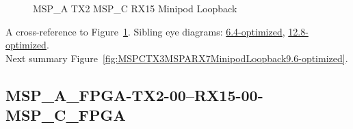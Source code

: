 \begin{figure}[h]
\begin{subfigure}{0.33\textwidth}
\hyperref[sec:MSPAFPGATX206RX1506MSPCFPGA9.6-optimized]{}
\end{subfigure}\hspace*{\fill}
\begin{subfigure}{0.33\textwidth}
\hyperref[sec:MSPAFPGATX207RX1507MSPCFPGA9.6-optimized]{}
\end{subfigure}\hspace*{\fill}
\begin{subfigure}{0.33\textwidth}
\hyperref[sec:MSPAFPGATX208RX1508MSPCFPGA9.6-optimized]{}
\end{subfigure}

\begin{subfigure}{0.33\textwidth}
\hyperref[sec:MSPAFPGATX209RX1509MSPCFPGA9.6-optimized]{}
\end{subfigure}\hspace*{\fill}
\begin{subfigure}{0.33\textwidth}
\hyperref[sec:MSPAFPGATX210RX1510MSPCFPGA9.6-optimized]{}
\end{subfigure}\hspace*{\fill}
\begin{subfigure}{0.33\textwidth}
\hyperref[sec:MSPAFPGATX211RX1511MSPCFPGA9.6-optimized]{}
\end{subfigure}

\caption{MSP\_A TX2 MSP\_C RX15 Minipod Loopback} \label{fig:MSPATX2MSPCRX15MinipodLoopback9.6-optimized}
\end{figure}

A cross-reference to Figure~\ref{fig:MSPATX2MSPCRX15MinipodLoopback9.6-optimized}.
Sibling eye diagrams: \hyperref[sec:MSPATX2MSPCRX15MinipodLoopback6.4-optimized]{6.4-optimized}, \hyperref[sec:MSPATX2MSPCRX15MinipodLoopback12.8-optimized]{12.8-optimized}. \\
Next summary Figure~\ref{fig:MSPCTX3MSPARX7MinipodLoopback9.6-optimized}.
\clearpage
% 
\subsection{MSP\_A\_FPGA-TX2-00--RX15-00-MSP\_C\_FPGA}\label{sec:MSPAFPGATX200RX1500MSPCFPGA9.6-optimized}

